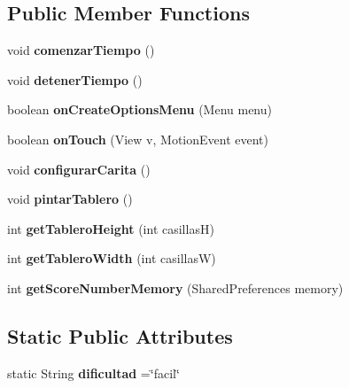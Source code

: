 \subsection*{Public Member Functions}
\begin{DoxyCompactItemize}
\item 
void {\bfseries comenzar\-Tiempo} ()\label{classcom_1_1example_1_1buscamina_1_1_main_activity_a15298a68ce32cabd192d99fc40cd4397}

\item 
void {\bfseries detener\-Tiempo} ()\label{classcom_1_1example_1_1buscamina_1_1_main_activity_acb7654b22d2bc0b845d7f75aa17177ac}

\item 
boolean {\bfseries on\-Create\-Options\-Menu} (Menu menu)\label{classcom_1_1example_1_1buscamina_1_1_main_activity_ab6f79265a2a00c349a78b4da0ba107dd}

\item 
boolean {\bfseries on\-Touch} (View v, Motion\-Event event)\label{classcom_1_1example_1_1buscamina_1_1_main_activity_ab895492dcef94c260ec0c1c431dee67c}

\item 
void {\bfseries configurar\-Carita} ()\label{classcom_1_1example_1_1buscamina_1_1_main_activity_aaecabb1a4e8e579a78ac5e9675b1a55f}

\item 
void {\bfseries pintar\-Tablero} ()\label{classcom_1_1example_1_1buscamina_1_1_main_activity_ac7fba346c56eff284044bf71b8dac600}

\item 
int {\bfseries get\-Tablero\-Height} (int casillas\-H)\label{classcom_1_1example_1_1buscamina_1_1_main_activity_ac46f49e25e2e5ff70d01720a45f250c6}

\item 
int {\bfseries get\-Tablero\-Width} (int casillas\-W)\label{classcom_1_1example_1_1buscamina_1_1_main_activity_a67bbee7494400bcb19a6bd870a55a701}

\item 
int {\bfseries get\-Score\-Number\-Memory} (Shared\-Preferences memory)\label{classcom_1_1example_1_1buscamina_1_1_main_activity_acacd5b454d1a448693c664e5a55d4dc6}

\end{DoxyCompactItemize}
\subsection*{Static Public Attributes}
\begin{DoxyCompactItemize}
\item 
static String {\bfseries dificultad} =\char`\"{}facil\char`\"{}\label{classcom_1_1example_1_1buscamina_1_1_main_activity_ab8f5155be2ad6f326c36a68b6ad90d4f}

\end{DoxyCompactItemize}

